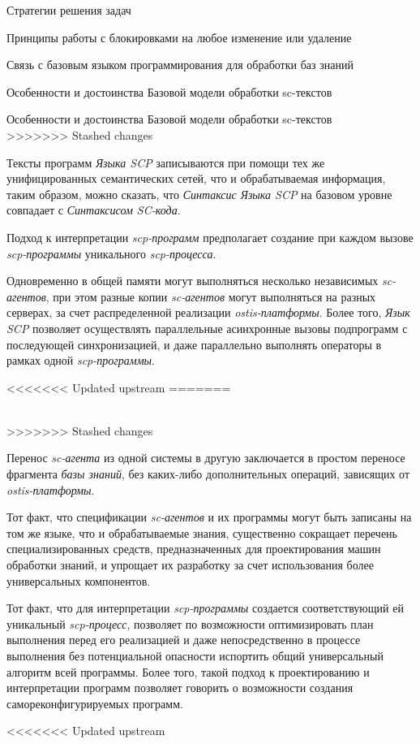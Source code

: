 \begin{frame}{Стратегии решения задач}
\begin{frame}{\large Принципы работы с блокировками на любое изменение или удаление}
\begin{frame}{Связь с базовым языком программирования для обработки баз
знаний}
\begin{frame}{Особенности и достоинства Базовой модели обработки sc-текстов}
\begin{frame}{Особенности и достоинства Базовой модели обработки sc-текстов}
\topline
\vspace{30}
 \\

>>>>>>> Stashed changes
\begin{textitemize}
    \item Тексты программ \textit{Языка SCP} записываются при помощи тех же унифицированных семантических сетей, что и обрабатываемая информация, таким образом, можно сказать, что \textit{Синтаксис Языка SCP} на базовом уровне совпадает с \textit{Синтаксисом SC-кода}.
    \item Подход к интерпретации \textit{scp-программ} предполагает создание при каждом вызове \textit{scp-программы} уникального \textit{scp-процесса}.
    \item Одновременно в общей памяти могут выполняться несколько независимых \textit{sc-агентов}, при этом разные копии \textit{sc-агентов} могут выполняться на разных серверах, за счет распределенной реализации \textit{ostis-платформы}. Более того, \textit{Язык SCP} позволяет осуществлять параллельные асинхронные вызовы подпрограмм с последующей синхронизацией, и даже параллельно	выполнять операторы в рамках одной \textit{scp-программы}.
    \end{textitemize}
\end{frame}
<<<<<<< Updated upstream
=======

\begin{frame}{}
\vspace{30}
 \\

>>>>>>> Stashed changes
\begin{textitemize}
    \item Перенос \textit{sc-агента} из одной системы в другую заключается в простом переносе фрагмента \textit{базы знаний}, без каких-либо дополнительных операций, зависящих от \textit{ostis-платформы}.
	\item Тот факт, что спецификации \textit{sc-агентов} и их программы могут быть записаны на том же языке, что и обрабатываемые знания, существенно сокращает перечень специализированных средств, предназначенных для проектирования машин обработки знаний, и упрощает их разработку за счет использования более универсальных компонентов.
	\item Тот факт, что для интерпретации \textit{scp-программы} создается соответствующий ей уникальный \textit{\mbox{scp-процесс}}, позволяет по возможности оптимизировать план выполнения перед его реализацией и даже непосредственно в процессе выполнения без потенциальной опасности испортить общий универсальный алгоритм всей программы. Более того, такой подход к проектированию и интерпретации программ позволяет говорить о возможности создания самореконфигурируемых программ.
\end{textitemize}
<<<<<<< Updated upstream


\end{frame}
\end{frame}
\end{frame}
\end{frame}
\end{frame}
